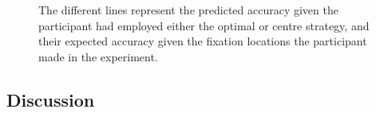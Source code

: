 \documentclass[12pt]{article}
\begin{document}
\begin{figure}
	\centering
	\captionsetup{justification=centering}
	\quad
	\caption{The different lines represent the predicted accuracy given the participant had employed either the optimal or centre strategy, and their expected accuracy given the fixation locations the participant made in the experiment.}
	\label{fig:Session2-prob-accresults}
\end{figure}

\subsection*{Discussion}
\end{document}
